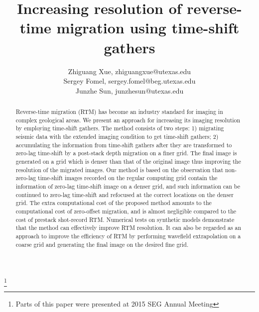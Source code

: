 \title{Increasing resolution of reverse-time migration using time-shift gathers}
\author{Zhiguang Xue, zhiguangxue@utexas.edu \\
Sergey Fomel, sergey.fomel@beg.utexas.edu \\
Junzhe Sun, junzhesun@utexas.edu}
\maketitle

\address{
Bureau of Economic Geology \\
John A. and Katherine G. Jackson School of Geosciences \\
The University of Texas at Austin \\
University Station, Box X \\
Austin, TX 78713-8924 \\
}

\footnote{Parts of this paper were presented at 2015 SEG Annual Meeting}


\begin{abstract}
	Reverse-time migration (RTM) has become an industry standard for imaging in complex geological areas.
	We present an approach for increasing its imaging resolution by employing time-shift gathers.
	The method consists of two steps: 1) migrating seismic data with the extended imaging condition to get time-shift gathers;
	2) accumulating the information from time-shift gathers
	after they are transformed to zero-lag time-shift by a post-stack depth migration on a finer grid.
	The final image is generated on a grid which is denser than that of the original image thus improving the resolution of the migrated images.
	Our method is based on the observation that non-zero-lag time-shift images recorded on the regular computing grid
	contain the information of zero-lag time-shift image on a denser grid, and such information
	can be continued to zero-lag time-shift and refocused at the correct locations on the denser grid.
	The extra computational cost of the proposed method amounts to the computational cost of zero-offset migration,
	and is almost negligible compared to the cost of prestack shot-record RTM.
	Numerical tests on synthetic models demonstrate that the method can effectively improve RTM resolution.
	It can also be regarded as an approach to improve the efficiency of RTM by performing wavefield extrapolation on a coarse grid and generating 
	the final image on the desired fine grid.
\end{abstract}

